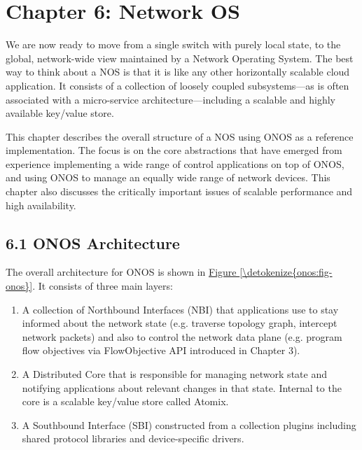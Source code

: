 \documentclass[letterpaper,11pt,english]{sphinxmanual}
\begin{document}
\chapter{Chapter 6:  Network OS}
\label{\detokenize{onos:chapter-6-network-os}}\label{\detokenize{onos::doc}}
We are now ready to move from a single switch with purely local state,
to the global, network-wide view maintained by a Network Operating
System. The best way to think about a NOS is that it is like any other
horizontally scalable cloud application. It consists of a collection
of loosely coupled subsystems—as is often associated with a
micro-service architecture—including a scalable and highly available
key/value store.

This chapter describes the overall structure of a NOS using ONOS as a
reference implementation. The focus is on the core abstractions that
have emerged from experience implementing a wide range of control
applications on top of ONOS, and using ONOS to manage an equally wide
range of network devices. This chapter also discusses the critically
important issues of scalable performance and high availability.


\section{6.1 ONOS Architecture}
\label{\detokenize{onos:onos-architecture}}
The overall architecture for ONOS is shown in \hyperref[\detokenize{onos:fig-onos}]{Figure \ref{\detokenize{onos:fig-onos}}}. It consists of three main layers:
\begin{enumerate}
\def\theenumi{\arabic{enumi}}
\def\labelenumi{\theenumi .}
\makeatletter\def\p@enumii{\p@enumi \theenumi .}\makeatother
\item {} 
A collection of Northbound Interfaces (NBI) that applications use to
stay informed about the network state (e.g. traverse topology graph,
intercept network packets) and also to control the network data plane
(e.g. program flow objectives via FlowObjective API introduced in
Chapter 3).

\item {} 
A Distributed Core that is responsible for managing network state
and notifying applications about relevant changes in that
state. Internal to the core is a scalable key/value store called
Atomix.

\item {} 
A Southbound Interface (SBI) constructed from a collection plugins
including shared protocol libraries and device-specific drivers.

\end{enumerate}
\end{document}
